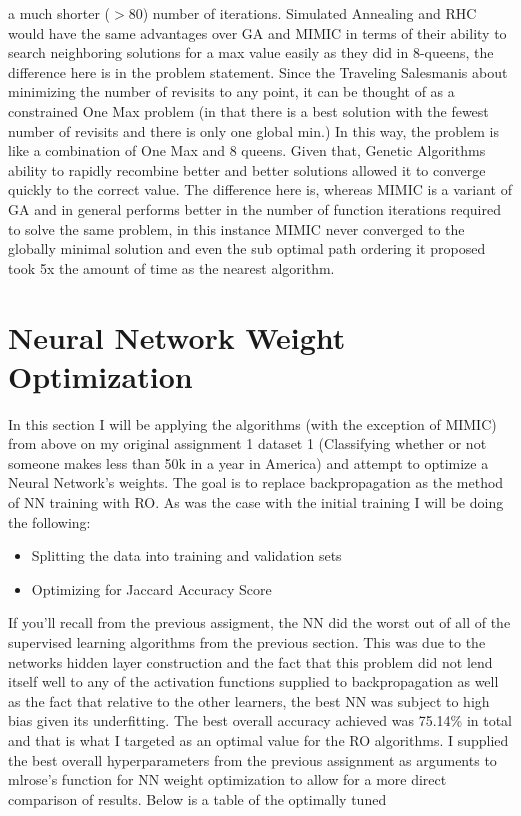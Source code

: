 \documentclass[11pt]{article}
\newcommand{\problemthree}{Traveling Salesman}
\begin{document}
    a much shorter ($> 80$) number of iterations.
    Simulated Annealing and RHC would have the same advantages over GA and MIMIC in terms of their ability to search neighboring
    solutions for a max value easily as they did in 8-queens, the difference here is in the problem statement.
    Since the \problemthree is about minimizing the number of revisits to any point, it can be thought of as a constrained
    One Max problem (in that there is a best solution with the fewest number of revisits and there is only one global min.)
    In this way, the problem is like a combination of One Max and 8 queens.
    Given that, Genetic Algorithms ability to rapidly recombine better and better solutions allowed it to converge quickly
    to the correct value.
    The difference here is, whereas MIMIC is a variant of GA and in general performs better in the number of function iterations
    required to solve the same problem, in this instance MIMIC never converged to the globally minimal solution and even the
    sub optimal path ordering it proposed took 5x the amount of time as the nearest algorithm.


    \section{Neural Network Weight Optimization}
    In this section I will be applying the algorithms (with the exception of MIMIC) from above on my original assignment 1 dataset 1 (Classifying whether
    or not someone makes less than \textdollar50k in a year in America) and attempt to optimize a Neural Network's weights.
    The goal is to replace backpropagation as the method of NN training with RO\@.
    As was the case with the initial training I will be doing the following:
    \begin{itemize}
        \item Splitting the data into training and validation sets
        \item Optimizing for Jaccard Accuracy Score\cite{wikipedia_2021}
    \end{itemize}
    If you'll recall from the previous assigment, the NN did the worst out of all of the supervised learning algorithms from
    the previous section.
    This was due to the networks hidden layer construction and the fact that this problem did not lend itself well to any
    of the activation functions supplied to backpropagation as well as the fact that relative to the other learners, the
    best NN was subject to high bias given its underfitting.
    The best overall accuracy achieved was 75.14\% in total and that is what I targeted as an optimal value for the RO algorithms.
    I supplied the best overall hyperparameters from the previous assignment as arguments to mlrose's function for NN weight optimization
    to allow for a more direct comparison of results.
    Below is a table of the optimally tuned
\end{document}
